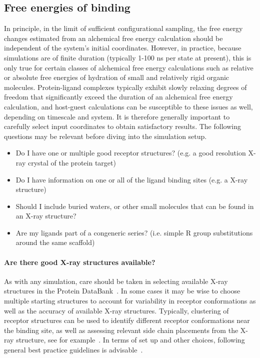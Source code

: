 \documentclass[9pt,bestpractices]{livecoms}
\begin{document}
\subsection{Free energies of binding}
\label{subsec:binding}
In principle, in the limit of sufficient configurational sampling, the free energy changes estimated from an alchemical free energy calculation should be independent of the system's initial coordinates. However, in practice, because simulations are of finite duration (typically 1-100 ns per state at present), this is only true for certain classes of alchemical free energy calculations such as relative or absolute free energies of hydration of small and relatively rigid organic molecules. Protein-ligand complexes typically exhibit slowly relaxing degrees of freedom that significantly exceed the duration of an alchemical free energy calculation, and host-guest calculations can be susceptible to these issues as well, depending on timescale and system. It is therefore generally important to carefully select input coordinates to obtain satisfactory results. 
The following questions may be relevant before diving into the simulation setup.

\begin{itemize}
    \item Do I have one or multiple good receptor structures? (e.g. a good resolution X-ray crystal of the protein target)
    \item Do I have information on one or all of the ligand binding sites (e.g. a X-ray structure)
    \item Should I include buried waters, or other small molecules that can be found in an X-ray structure?
    \item Are my ligands part of a congeneric series? (i.e. simple R group substitutions around the same scaffold)
    \end{itemize}

\paragraph{Are there good X-ray structures available?}
As with any simulation, care should be taken in selecting available X-ray structures in the Protein DataBank~\cite{berman2003announcing}. In some cases it may be wise to choose multiple starting structures to account for variability in receptor conformations as well as the accuracy of available X-ray structures. Typically, clustering of receptor structures can be used to identify different receptor conformations near the binding site, as well as assessing relevant side chain placements from the X-ray structure, see for example~\cite{mey2016blinded}. In terms of set up and other choices, following general best practice guidelines is advisable~\cite{braun2019best}.
\end{document}
